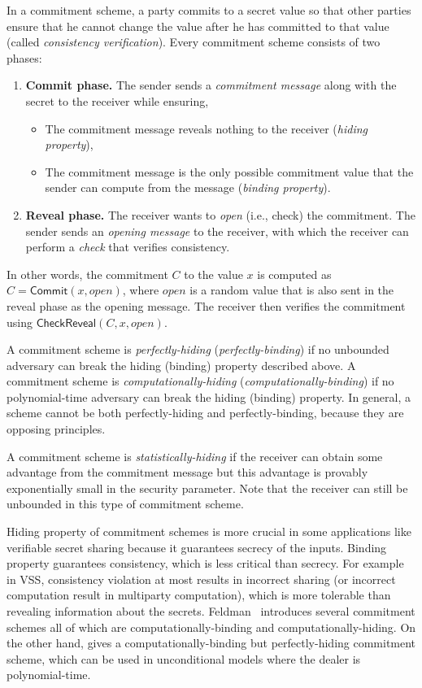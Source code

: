 \documentclass[11pt]{article}
\theoremstyle{plain}
\begin{document}
In a commitment scheme, a party commits to a secret value so that
other parties ensure that he cannot change the value after he has
committed to that value (called \emph{consistency verification}).
Every commitment scheme consists of two phases: 
\begin{enumerate}
	\item \textbf{Commit phase.} The sender sends a \emph{commitment message}
	along with the secret to the receiver while ensuring, 
	\begin{itemize}
		\item The commitment message reveals nothing to the receiver (\emph{hiding
			property}), 
		\item The commitment message is the only possible commitment value that
		the sender can compute from the message (\emph{binding property}). 
	\end{itemize}
	\item \textbf{Reveal phase.} The receiver wants to \emph{open} (i.e., check)
	the commitment. The sender sends an \emph{opening message} to the
	receiver, with which the receiver can perform a \emph{check} that
	verifies consistency. 
\end{enumerate}
In other words, the commitment $C$ to the value $x$ is computed
as $C=\mathsf{Commit}(x,open)$, where $open$ is a random value that
is also sent in the reveal phase as the opening message. The receiver
then verifies the commitment using $\mathsf{CheckReveal}(C,x,open)$.

A commitment scheme is \emph{perfectly-hiding} (\emph{perfectly-binding})
if no unbounded adversary can break the hiding (binding) property
described above. A commitment scheme is \emph{computationally-hiding}
(\emph{computationally-binding}) if no polynomial-time adversary can
break the hiding (binding) property. In general, a scheme cannot be
both perfectly-hiding and perfectly-binding, because they are opposing
principles.

A commitment scheme is \emph{statistically-hiding} if the receiver
can obtain some advantage from the commitment message but this advantage
is provably exponentially small in the security parameter. Note that
the receiver can still be unbounded in this type of commitment scheme.

Hiding property of commitment schemes is more crucial in some applications
like verifiable secret sharing because it guarantees secrecy of the
inputs. Binding property guarantees consistency, which is less critical
than secrecy. For example in VSS, consistency violation at most results
in incorrect sharing (or incorrect computation result in multiparty
computation), which is more tolerable than revealing information about
the secrets. Feldman~\cite{Feldman:1987:PSN:1382440.1383000} introduces
several commitment schemes all of which are computationally-binding
and computationally-hiding. On the other hand, \cite{Pedersen:1991:NIS:646756.705507}
gives a computationally-binding but perfectly-hiding commitment scheme,
which can be used in unconditional models where the dealer is polynomial-time.
\end{document}
